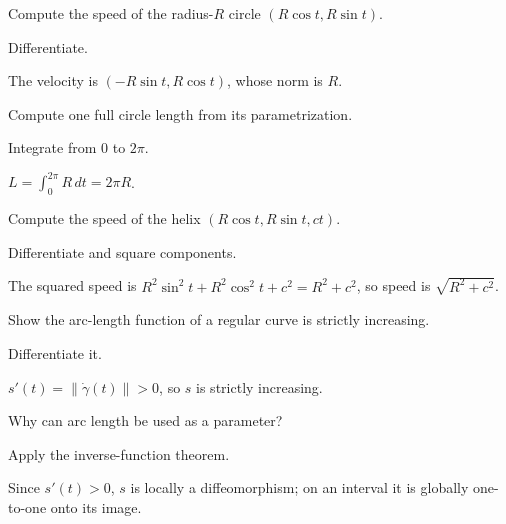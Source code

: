 \begin{exercise}\label{exr:vii12-11}
Compute the speed of the radius-$R$ circle $(R\cos t,R\sin t)$.
\end{exercise}
\begin{hint}
Differentiate.
\end{hint}
\begin{solution}
The velocity is $(-R\sin t,R\cos t)$, whose norm is $R$.
\end{solution}

\begin{exercise}\label{exr:vii12-12}
Compute one full circle length from its parametrization.
\end{exercise}
\begin{hint}
Integrate from $0$ to $2\pi$.
\end{hint}
\begin{solution}
$L=\int_0^{2\pi}R\,dt=2\pi R$.
\end{solution}

\begin{exercise}\label{exr:vii12-13}
Compute the speed of the helix $(R\cos t,R\sin t,ct)$.
\end{exercise}
\begin{hint}
Differentiate and square components.
\end{hint}
\begin{solution}
The squared speed is $R^2\sin^2t+R^2\cos^2t+c^2=R^2+c^2$, so speed is $\sqrt{R^2+c^2}$.
\end{solution}

\begin{exercise}\label{exr:vii12-14}
Show the arc-length function of a regular curve is strictly increasing.
\end{exercise}
\begin{hint}
Differentiate it.
\end{hint}
\begin{solution}
$s'(t)=\|\dot\gamma(t)\|>0$, so $s$ is strictly increasing.
\end{solution}

\begin{exercise}\label{exr:vii12-15}
Why can arc length be used as a parameter?
\end{exercise}
\begin{hint}
Apply the inverse-function theorem.
\end{hint}
\begin{solution}
Since $s'(t)>0$, $s$ is locally a diffeomorphism; on an interval it is globally one-to-one onto its image.
\end{solution}


